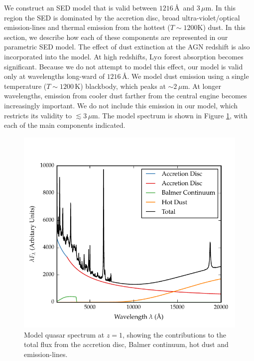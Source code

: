 We construct an SED model that is valid between $1216$\,\AA\, and $3$\,$\mu$m.
In this region the SED is dominated by the accretion disc, broad ultra-violet/optical emission-lines and thermal emission from the hottest ($T\sim1200$K) dust. 
In this section, we describe how each of these components are represented in our parametric SED model.  
The effect of dust extinction at the AGN redshift is also incorporated into the model. 
At high redshifts, Ly$\alpha$ forest absorption becomes significant. 
Because we do not attempt to model this effect, our model is valid only at wavelengths long-ward of $1216$\,\AA. 
We model dust emission using a single temperature ($T\sim1200$\,K) blackbody, which peaks at $\sim2$\,$\mu$m. 
At longer wavelengths, emission from cooler dust farther from the central engine becomes increasingly important. 
We do not include this emission in our model, which restricts its validity to $\lesssim3$\,$\mu$m.
The model spectrum is shown in Figure \ref{fig:modelsed}, with each of the main components indicated. 

\begin{figure}[h!]
  \centering
  \includegraphics[width=\textwidth]{figures/chapter05/sed_model.pdf}
  \caption[{Model quasar spectrum at $z=1$, showing the contributions to the total flux from the accretion disc, Balmer continuum, hot dust and emission-lines.}]{Model quasar spectrum at $z=1$, showing the contributions to the total flux from the accretion disc, Balmer continuum, hot dust and emission-lines. }
  \label{fig:modelsed}
\end{figure}

